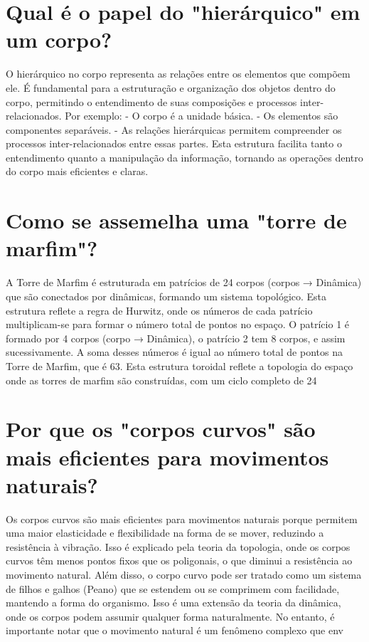 \documentclass[11pt,a4paper]{article}
\begin{document}
\section{Qual é o papel do "hierárquico" em um corpo?}
O hierárquico no corpo representa as relações entre os elementos que compõem ele. É fundamental para a estruturação e organização dos objetos dentro do corpo, permitindo o entendimento de suas composições e processos inter-relacionados. Por exemplo: - O corpo é a unidade básica. - Os elementos são componentes separáveis. - As relações hierárquicas permitem compreender os processos inter-relacionados entre essas partes. Esta estrutura facilita tanto o entendimento quanto a manipulação da informação, tornando as operações dentro do corpo mais eficientes e claras.

\section{Como se assemelha uma "torre de marfim"?}
A Torre de Marfim é estruturada em patrícios de 24 corpos (corpos → Dinâmica) que são conectados por dinâmicas, formando um sistema topológico. Esta estrutura reflete a regra de Hurwitz, onde os números de cada patrício multiplicam-se para formar o número total de pontos no espaço. O patrício 1 é formado por 4 corpos (corpo → Dinâmica), o patrício 2 tem 8 corpos, e assim sucessivamente. A soma desses números é igual ao número total de pontos na Torre de Marfim, que é 63. Esta estrutura toroidal reflete a topologia do espaço onde as torres de marfim são construídas, com um ciclo completo de 24

\section{Por que os "corpos curvos" são mais eficientes para movimentos naturais?}
Os corpos curvos são mais eficientes para movimentos naturais porque permitem uma maior elasticidade e flexibilidade na forma de se mover, reduzindo a resistência à vibração. Isso é explicado pela teoria da topologia, onde os corpos curvos têm menos pontos fixos que os poligonais, o que diminui a resistência ao movimento natural. Além disso, o corpo curvo pode ser tratado como um sistema de filhos e galhos (Peano) que se estendem ou se comprimem com facilidade, mantendo a forma do organismo. Isso é uma extensão da teoria da dinâmica, onde os corpos podem assumir qualquer forma naturalmente. No entanto, é importante notar que o movimento natural é um fenômeno complexo que env
\end{document}
